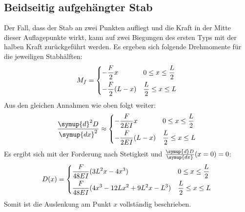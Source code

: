 \subsection{Beidseitig aufgehängter Stab}
Der Fall, dass der Stab an zwei Punkten aufliegt und die Kraft in der Mitte dieser
Auflagepunkte wirkt, kann auf zwei Biegungen des ersten Typs mit der halben Kraft zurückgeführt werden.
Es ergeben sich folgende Drehmomente für die jeweiligen Stabhälften:
\begin{align}
    M_f =
    \begin{dcases}
        -\frac{F}{2}x       & 0 \leq x \leq \frac{L}{2}\\
        -\frac{F}{2}(L-x)   & \frac{L}{2} \leq x \leq L
    \end{dcases}
\end{align}
Aus den gleichen Annahmen wie oben folgt weiter:
\begin{align}
    \frac{\symup{d}^2D}{\symup{dx}^2} \approx 
    \begin{dcases}
        -\frac{F}{2EI} x     & 0 \leq x \leq \frac{L}{2}\\
        -\frac{F}{2EI} (L-x) & \frac{L}{2} \leq x \leq L
    \end{dcases}    
\end{align}
Es ergibt sich mit der Forderung nach Stetigkeit und \mbox{$\frac{\symup{d}D}{\symup{dx}}(x=0) = 0$}:
\begin{equation}
    D(x) =
    \begin{dcases}
    \frac{F}{48EI}(3L^2x-4x^3) & 0 \leq x \leq \frac{L}{2}\\
    \frac{F}{48EI}(4x^3-12Lx^2+9L^2x -L^3) & \frac{L}{2} \leq x \leq L
    \end{dcases}
\end{equation}
Somit ist die Auslenkung am Punkt $x$ vollständig beschrieben.